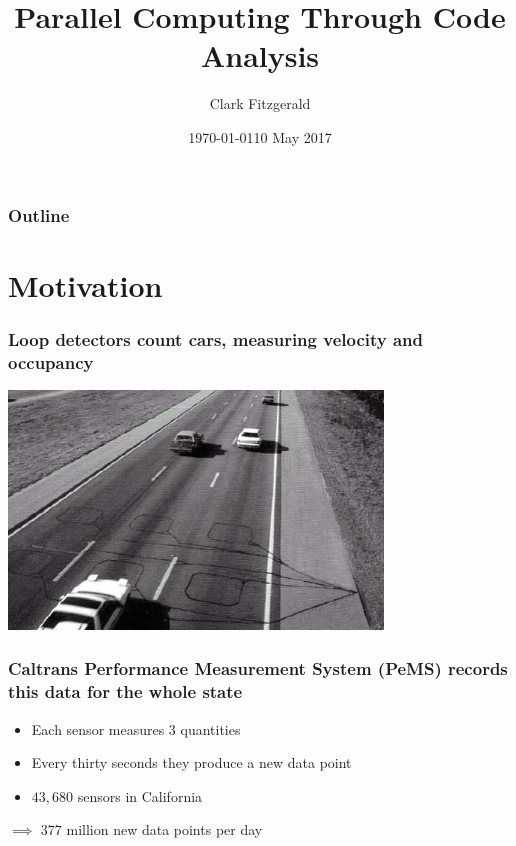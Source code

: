 \documentclass{beamer}
\begin{document}
\title{Parallel Computing Through Code Analysis}
\date{\today}
\date{10 May 2017}
\author{Clark Fitzgerald}

\frame{\titlepage}

\begin{frame}
    \frametitle{Outline}
    \tableofcontents
\end{frame}

\section{Motivation}
\begin{frame}

    \frametitle{Loop detectors count cars, measuring velocity and
    occupancy}

\centerline{\includegraphics[height=2.5in]{loop_detector.jpg}}

\end{frame}
\begin{frame}

\frametitle{Caltrans Performance Measurement System (PeMS) records this
data for the whole state}

    \begin{itemize}
        \item Each sensor measures 3 quantities
        \item Every thirty seconds they produce a new data point
        \item $43,680$ sensors in California
    \end{itemize}

    $\implies$  377 million new data points per day

\end{frame}
\end{document}
